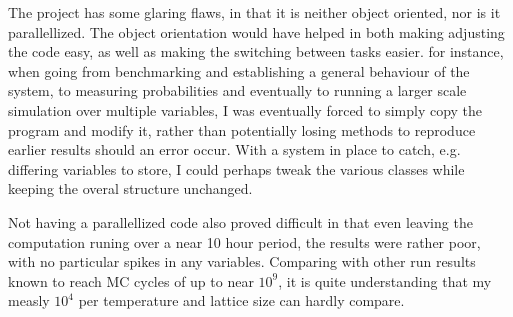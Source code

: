 \documentclass[10pt, twocolumn]{revtex4-1}
\begin{document}
The project has some glaring flaws, in that it is neither object oriented, nor is it parallellized. The object orientation would have helped in both making
adjusting the code easy, as well as making the switching between tasks easier. for instance, when going from benchmarking and establishing a general
behaviour of the system, to measuring probabilities and eventually to running a larger scale simulation over multiple variables, I was eventually forced
to simply copy the program and modify it, rather than potentially losing methods to reproduce earlier results should an error occur. With a system in place
to catch, e.g. differing variables to store, I could perhaps tweak the various classes while keeping the overal structure unchanged.

Not having a parallellized code also proved difficult in that even leaving the computation runing over a near 10 hour period, the results were rather poor,
with no particular spikes in any variables. Comparing with other run results known to reach MC cycles of up to near $10^9$, it is quite understanding that
my measly $10^4$ per temperature and lattice size can hardly compare.



\end{document}
